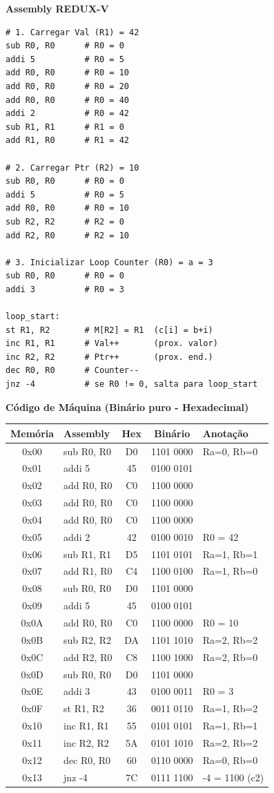 \documentclass[11pt,a4paper]{article}
\begin{document}
\textbf{Assembly REDUX-V}
\begin{lstlisting}
# 1. Carregar Val (R1) = 42
sub R0, R0      # R0 = 0
addi 5          # R0 = 5
add R0, R0      # R0 = 10
add R0, R0      # R0 = 20
add R0, R0      # R0 = 40
addi 2          # R0 = 42
sub R1, R1      # R1 = 0
add R1, R0      # R1 = 42

# 2. Carregar Ptr (R2) = 10
sub R0, R0      # R0 = 0
addi 5          # R0 = 5
add R0, R0      # R0 = 10
sub R2, R2      # R2 = 0
add R2, R0      # R2 = 10

# 3. Inicializar Loop Counter (R0) = a = 3
sub R0, R0      # R0 = 0
addi 3          # R0 = 3

loop_start:
st R1, R2       # M[R2] = R1  (c[i] = b+i)
inc R1, R1      # Val++       (prox. valor)
inc R2, R2      # Ptr++       (prox. end.)
dec R0, R0      # Counter--
jnz -4          # se R0 != 0, salta para loop_start
\end{lstlisting}

\textbf{Código de Máquina (Binário puro - Hexadecimal)}
\begin{table}[H]
\centering
\begin{tabular}{clccl}
\toprule
\textbf{Memória} & \textbf{Assembly} & \textbf{Hex} & \textbf{Binário} & \textbf{Anotação} \\
\midrule
0x00 & sub R0, R0 & D0 & 1101 0000 & Ra=0, Rb=0 \\
0x01 & addi 5     & 45 & 0100 0101 & \\
0x02 & add R0, R0 & C0 & 1100 0000 & \\
0x03 & add R0, R0 & C0 & 1100 0000 & \\
0x04 & add R0, R0 & C0 & 1100 0000 & \\
0x05 & addi 2     & 42 & 0100 0010 & R0 = 42 \\
0x06 & sub R1, R1 & D5 & 1101 0101 & Ra=1, Rb=1 \\
0x07 & add R1, R0 & C4 & 1100 0100 & Ra=1, Rb=0 \\
0x08 & sub R0, R0 & D0 & 1101 0000 & \\
0x09 & addi 5     & 45 & 0100 0101 & \\
0x0A & add R0, R0 & C0 & 1100 0000 & R0 = 10 \\
0x0B & sub R2, R2 & DA & 1101 1010 & Ra=2, Rb=2 \\
0x0C & add R2, R0 & C8 & 1100 1000 & Ra=2, Rb=0 \\
0x0D & sub R0, R0 & D0 & 1101 0000 & \\
0x0E & addi 3     & 43 & 0100 0011 & R0 = 3 \\
0x0F & st R1, R2  & 36 & 0011 0110 & Ra=1, Rb=2 \\
0x10 & inc R1, R1 & 55 & 0101 0101 & Ra=1, Rb=1 \\
0x11 & inc R2, R2 & 5A & 0101 1010 & Ra=2, Rb=2 \\
0x12 & dec R0, R0 & 60 & 0110 0000 & Ra=0, Rb=0 \\
0x13 & jnz -4     & 7C & 0111 1100 & -4 = 1100 (c2) \\
\bottomrule
\end{tabular}
\end{table}
\end{document}
